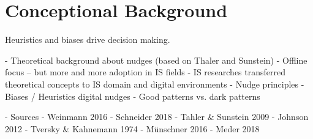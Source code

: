 \section{Conceptional Background}


Heuristics and biases drive decision making. 


-	Theoretical background about nudges (based on Thaler and Sunstein)
-	Offline focus – but more and more adoption in IS fields
-	IS researches transferred theoretical concepts to IS domain and digital environments
-	Nudge principles
-	Biases / Heuristics digital nudges
-	Good patterns vs. dark patterns


- Sources
	- Weinmann 2016
	- Schneider 2018
	- Tahler \& Sunstein 2009
	- Johnson 2012
	- Tversky \& Kahnemann 1974
	- Münschner 2016
	- Meder 2018
	
	